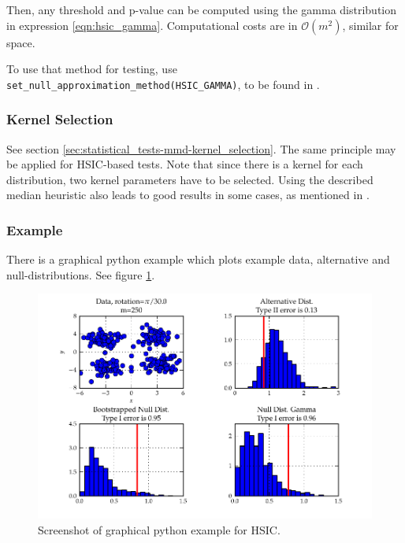 Then, any threshold and p-value can be computed using the gamma distribution in expression \ref{eqn:hsic_gamma}. Computational costs are in $\mathcal{O}(m^2)$, similar for space.

To use that method for testing, use \texttt{set\_null\_approximation\_method(HSIC\_GAMMA)}, to be found in .

\subsubsection{Kernel Selection}
See section \ref{sec:statistical_tests-mmd-kernel_selection}. The same principle may be applied for HSIC-based tests. Note that since there is a kernel for each distribution, two kernel parameters have to be selected. Using the described median heuristic also leads to good results in some cases, as mentioned in \citep{Gretton2008d}.

\subsubsection{Example}
There is a graphical python example which plots example data, alternative and null-distributions. See figure \ref{fig:statistical_testing-hsic}.

\begin{figure}\centering
		\includegraphics{fig/statistical_testing/hsic}
		\caption{Screenshot of graphical python example for HSIC.}
		\label{fig:statistical_testing-hsic}
\end{figure}